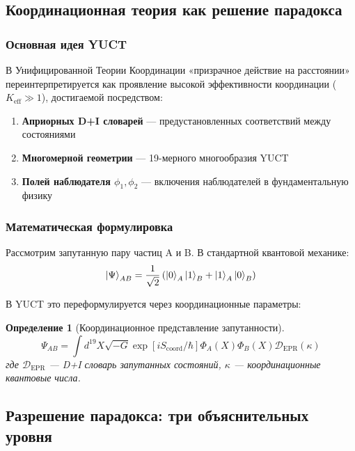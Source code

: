 \documentclass[11pt,a4paper]{article}
\newtheorem{definition}{Определение}
\begin{document}
	\subsection{Координационная теория как решение парадокса}
	\label{subsec:yuct-solution}
	
	\subsubsection{Основная идея YUCT}
	В Унифицированной Теории Координации «призрачное действие на расстоянии» переинтерпретируется как проявление высокой эффективности координации ($K_{\mathrm{eff}} \gg 1$), достигаемой посредством:
	
	\begin{enumerate}
		\item \textbf{Априорных D+I словарей} — предустановленных соответствий между состояниями
		\item \textbf{Многомерной геометрии} — 19-мерного многообразия YUCT
		\item \textbf{Полей наблюдателя $\phi_1, \phi_2$} — включения наблюдателей в фундаментальную физику
	\end{enumerate}
	
	\subsubsection{Математическая формулировка}
	Рассмотрим запутанную пару частиц A и B. В стандартной квантовой механике:
	\begin{equation}
		\ket{\Psi}_{AB} = \frac{1}{\sqrt{2}} \left( \ket{0}_A \ket{1}_B + \ket{1}_A \ket{0}_B \right)
	\end{equation}
	
	В YUCT это переформулируется через координационные параметры:
	
	\begin{definition}[Координационное представление запутанности]
		\begin{equation}
			\Psi_{AB} = \int d^{19}X \sqrt{-G} \exp\left[i S_{\text{coord}}/\hbar\right] \Phi_A(X) \Phi_B(X) \mathcal{D}_{\text{EPR}}(\kappa)
		\end{equation}
		где $\mathcal{D}_{\text{EPR}}$ — D+I словарь запутанных состояний, $\kappa$ — координационные квантовые числа.
	\end{definition}
	
	\subsection{Разрешение парадокса: три объяснительных уровня}
	\label{subsec:three-levels}
	
\end{document}
